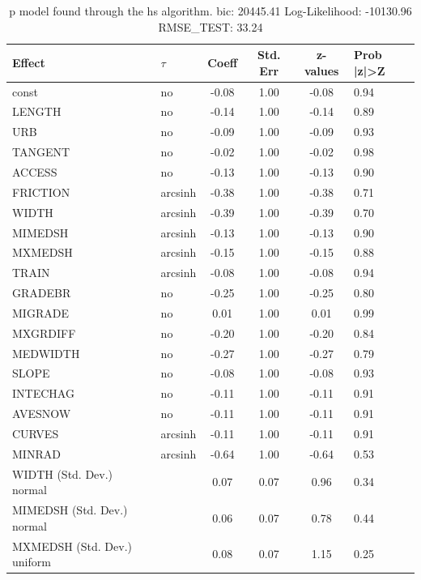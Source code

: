 \begin{table}
	\caption{p model found through the hs algorithm. bic: 20445.41 Log-Likelihood: -10130.96 RMSE_TEST: 33.24}
	\begin{center}
		\begin{tabular}{|l|l|c|c|c|l|}
			\hline
			Effect & $\tau$ & Coeff & Std. Err & z-values & Prob |z|>Z \\
			\hline
			const & no & -0.08 & 1.00 & -0.08 & 0.94 \\
			\hline
			LENGTH & no & -0.14 & 1.00 & -0.14 & 0.89 \\
			\hline
			URB & no & -0.09 & 1.00 & -0.09 & 0.93 \\
			\hline
			TANGENT & no & -0.02 & 1.00 & -0.02 & 0.98 \\
			\hline
			ACCESS & no & -0.13 & 1.00 & -0.13 & 0.90 \\
			\hline
			FRICTION & arcsinh & -0.38 & 1.00 & -0.38 & 0.71 \\
			\hline
			WIDTH & arcsinh & -0.39 & 1.00 & -0.39 & 0.70 \\
			\hline
			MIMEDSH & arcsinh & -0.13 & 1.00 & -0.13 & 0.90 \\
			\hline
			MXMEDSH & arcsinh & -0.15 & 1.00 & -0.15 & 0.88 \\
			\hline
			TRAIN & arcsinh & -0.08 & 1.00 & -0.08 & 0.94 \\
			\hline
			GRADEBR & no & -0.25 & 1.00 & -0.25 & 0.80 \\
			\hline
			MIGRADE & no & 0.01 & 1.00 & 0.01 & 0.99 \\
			\hline
			MXGRDIFF & no & -0.20 & 1.00 & -0.20 & 0.84 \\
			\hline
			MEDWIDTH & no & -0.27 & 1.00 & -0.27 & 0.79 \\
			\hline
			SLOPE & no & -0.08 & 1.00 & -0.08 & 0.93 \\
			\hline
			INTECHAG & no & -0.11 & 1.00 & -0.11 & 0.91 \\
			\hline
			AVESNOW & no & -0.11 & 1.00 & -0.11 & 0.91 \\
			\hline
			CURVES & arcsinh & -0.11 & 1.00 & -0.11 & 0.91 \\
			\hline
			MINRAD & arcsinh & -0.64 & 1.00 & -0.64 & 0.53 \\
			\hline
			WIDTH (Std. Dev.) normal &  & 0.07 & 0.07 & 0.96 & 0.34 \\
			\hline
			MIMEDSH (Std. Dev.) normal &  & 0.06 & 0.07 & 0.78 & 0.44 \\
			\hline
			MXMEDSH (Std. Dev.) uniform &  & 0.08 & 0.07 & 1.15 & 0.25 \\

\end{tabular}
\end{center}
\end{table}
